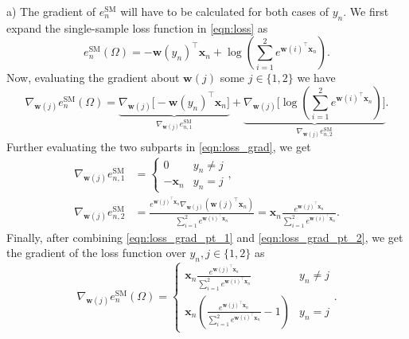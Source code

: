 \documentclass{article}
\renewcommand{\vec}[1]{\mathbf{#1}}
\begin{document}
    a) The gradient of $e_n^{\text{SM}}$ will have to be calculated for both
    cases of $y_n$. We first expand the single-sample loss function in 
    \eqref{eqn:loss} as
    \begin{equation}
        \label{eqn:loss_rewritten}
        e_n^{\text{SM}}(\Omega) = -\vec{w}(y_n)^\top\vec{x}_n+\log\left
        (\sum_{i=1}^2e^{\vec{w}(i)^\top\vec{x}_n}\right).
    \end{equation}
    Now, evaluating the gradient about $\vec{w}(j)$ some $j\in\{1,2\}$ we have
    \begin{equation}
        \label{eqn:loss_grad}
        \nabla_{\vec{w}(j)}e^{\text{SM}}_n(\Omega) = 
        \underbrace{\nabla_{\vec{w}(j)}\big[-\vec{w}(y_n)^\top\vec{x}_n\big]}_
        {\nabla_{\vec{w}(j)}e_{n,1}^{\text{SM}}}
        + \underbrace{\nabla_{\vec{w}(j)}\Bigg[\log\left
        (\sum_{i=1}^2e^{\vec{w}(i)^\top\vec{x}_n}\right)\Bigg]}_
        {\nabla_{\vec{w}(j)}e_{n,2}^{\text{SM}}}.
    \end{equation}
    Further evaluating the two subparts in \eqref{eqn:loss_grad}, we get
    \begin{align}
        \label{eqn:loss_grad_pt_1}
        \nabla_{\vec{w}(j)}e_{n,1}^{\text{SM}} &= 
        \begin{cases}
            0 & y_n \neq j\\
            -\vec{x}_n & y_n = j
        \end{cases},\\
        \label{eqn:loss_grad_pt_2}
        \nabla_{\vec{w}(j)}e_{n,2}^{\text{SM}} &= \frac{e^{\vec{w}(j)^\top\vec
        {x}_n}\nabla_{\vec{w}(j)}(\vec{w}(j)^\top\vec{x}_n)}{\sum_{i=1}^2e^
        {\vec{w}(i)^\top\vec{x}_n}} = \vec{x}_n\frac{e^{\vec{w}(j)^\top\vec{x}
        _n}}{\sum_{i=1}^2e^{\vec{w}(i)^\top\vec{x}_n}}.
    \end{align}
    Finally, after combining \eqref{eqn:loss_grad_pt_1} and 
    \eqref{eqn:loss_grad_pt_2}, we get the gradient of the loss 
    function over $y_n,j\in\{1,2\}$ as
    \begin{equation}
        \nabla_{\vec{w}(j)}e^{\text{SM}}_n(\Omega) = 
        \begin{cases}
            \vec{x}_n\frac{e^{\vec{w}(j)^\top\vec{x}_n}}{\sum_{i=1}^2e^{\vec
            {w}(i)^\top\vec{x}_n}} & y_n \neq j\\ 
            \vec{x}_n\left(\frac{e^{\vec{w}(j)^\top\vec{x}_n}}{\sum_{i=1}^2e^
            {\vec{w}(i)^\top\vec{x}_n}}-1\right) & y_n = j
        \end{cases}.
    \end{equation}
\end{document}
